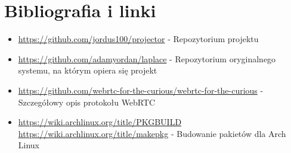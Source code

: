 \documentclass[a4paper,11pt]{article}
\begin{document}
    \section{Bibliografia i linki}
        \begin{itemize}
        \item \url{https://github.com/jordus100/projector} - Repozytorium projektu
        \item \url{https://github.com/adamyordan/laplace} - Repozytorium oryginalnego systemu, na którym opiera się projekt
        \item \url{https://github.com/webrtc-for-the-curious/webrtc-for-the-curious} - Szczegółowy opis protokołu WebRTC
        \item \url{https://wiki.archlinux.org/title/PKGBUILD} \\ \url{https://wiki.archlinux.org/title/makepkg} - Budowanie pakietów dla Arch Linux
        \end{itemize}
\end{document}
